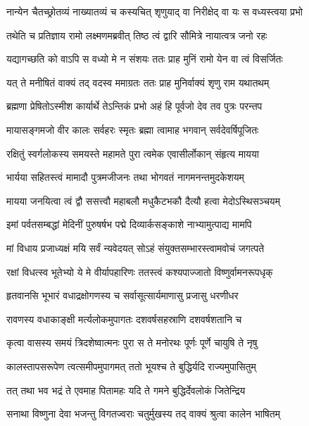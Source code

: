 \twolineshloka
{नान्येन चैतच्छ्रोतव्यं नाख्यातव्यं च कस्यचित्}
{शृणुयाद् वा निरीक्षेद् वा यः स वध्यस्त्वया प्रभो} %

\twolineshloka
{तथेति च प्रतिज्ञाय रामो लक्ष्मणमब्रवीत्}
{तिष्ठ त्वं द्वारि सौमित्रे नायात्वत्र जनो रहः} %

\twolineshloka
{यद्यागच्छति को वाऽपि स वध्यो मे न संशयः}
{ततः प्राह मुनिं रामो येन वा त्वं विसर्जितः} %

\twolineshloka
{यत् ते मनीषितं वाक्यं तद् वदस्व ममाग्रतः}
{ततः प्राह मुनिर्वाक्यं शृणु राम यथातथम्} %

\twolineshloka
{ब्रह्मणा प्रेषितोऽस्मीश कार्यार्थे तेऽन्तिकं प्रभो}
{अहं हि पूर्वजो देव तव पुत्रः परन्तप} %

\twolineshloka
{मायासङ्गमजो वीर कालः सर्वहरः स्मृतः}
{ब्रह्मा त्वामाह भगवान् सर्वदेवर्षिपूजितः} %

\twolineshloka
{रक्षितुं स्वर्गलोकस्य समयस्ते महामते}
{पुरा त्वमेक एवासीर्लोकान् संहृत्य मायया} %

\twolineshloka
{भार्यया सहितस्त्वं मामादौ पुत्रमजीजनः}
{तथा भोगवतं नागमनन्तमुदकेशयम्} %

\twolineshloka
{मायया जनयित्वा त्वं द्वौ ससत्त्वौ महाबलौ}
{मधुकैटभकौ दैत्यौ हत्वा मेदोऽस्थिसञ्चयम्} %

\twolineshloka
{इमां पर्वतसम्बद्धां मेदिनीं पुरुषर्षभ}
{पद्मे दिव्यार्कसङ्काशे नाभ्यामुत्पाद्य मामपि} %

\twolineshloka
{मां विधाय प्रजाध्यक्षं मयि सर्वं न्यवेदयत्}
{सोऽहं संयुक्तसम्भारस्त्वामवोचं जगत्पते} %

\twolineshloka
{रक्षां विधत्स्व भूतेभ्यो ये मे वीर्यापहारिणः}
{ततस्त्वं कश्यपाज्जातो विष्णुर्वामनरूपधृक्} %

\twolineshloka
{हृतवानसि भूभारं वधाद्रक्षोगणस्य च}
{सर्वासूत्सार्यमाणासु प्रजासु धरणीधर} %

\twolineshloka
{रावणस्य वधाकाङ्क्षी मर्त्यलोकमुपागतः}
{दशवर्षसहस्राणि दशवर्षशतानि च} %

\twolineshloka
{कृत्वा वासस्य समयं त्रिदशेष्वात्मनः पुरा}
{स ते मनोरथः पूर्णः पूर्णे चायुषि ते नृषु} %

\twolineshloka
{कालस्तापसरूपेण त्वत्समीपमुपागमत्}
{ततो भूयश्च ते बुद्धिर्यदि राज्यमुपासितुम्} %

\twolineshloka
{तत् तथा भव भद्रं ते एवमाह पितामहः}
{यदि ते गमने बुद्धिर्देवलोकं जितेन्द्रिय} %

\twolineshloka
{सनाथा विष्णुना देवा भजन्तु विगतज्वराः}
{चतुर्मुखस्य तद् वाक्यं श्रुत्वा कालेन भाषितम्} %

